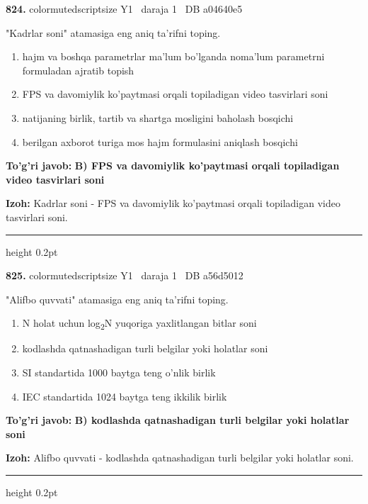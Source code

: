 \documentclass[10pt,a4paper,oneside]{article}
\begin{document}
\noindent\textbf{\color{ink}824.}  {color{muted}scriptsize Y1 \textbullet\ daraja 1 \textbullet\ DB a04640e5}
\par
"Kadrlar soni" atamasiga eng aniq ta'rifni toping.
\begin{enumerate}[label=\Alph*),leftmargin=9mm]
\item hajm va boshqa parametrlar ma'lum bo'lganda noma'lum parametrni formuladan ajratib topish
\item FPS va davomiylik ko'paytmasi orqali topiladigan video tasvirlari soni
\item natijaning birlik, tartib va shartga mosligini baholash bosqichi
\item berilgan axborot turiga mos hajm formulasini aniqlash bosqichi
\end{enumerate}
\begin{tcolorbox}[enhanced,breakable,colback=teal!4,colframe=teal!50!black,boxrule=0.5pt,arc=1.1mm,left=3mm,right=3mm,top=1.7mm,bottom=1.7mm,before skip=2mm,after skip=2mm]
\textbf{\color{teal}To'g'ri javob:} \textbf{B) FPS va davomiylik ko'paytmasi orqali topiladigan video tasvirlari soni}
\par\smallskip
\textbf{Izoh:} Kadrlar soni - FPS va davomiylik ko'paytmasi orqali topiladigan video tasvirlari soni.
\end{tcolorbox}
\vspace{2mm}\hrule height 0.2pt \vspace{3mm}

\noindent\textbf{\color{ink}825.}  {color{muted}scriptsize Y1 \textbullet\ daraja 1 \textbullet\ DB a56d5012}
\par
"Alifbo quvvati" atamasiga eng aniq ta'rifni toping.
\begin{enumerate}[label=\Alph*),leftmargin=9mm]
\item N holat uchun log\textsubscript{2}N yuqoriga yaxlitlangan bitlar soni
\item kodlashda qatnashadigan turli belgilar yoki holatlar soni
\item SI standartida 1000 baytga teng o'nlik birlik
\item IEC standartida 1024 baytga teng ikkilik birlik
\end{enumerate}
\begin{tcolorbox}[enhanced,breakable,colback=teal!4,colframe=teal!50!black,boxrule=0.5pt,arc=1.1mm,left=3mm,right=3mm,top=1.7mm,bottom=1.7mm,before skip=2mm,after skip=2mm]
\textbf{\color{teal}To'g'ri javob:} \textbf{B) kodlashda qatnashadigan turli belgilar yoki holatlar soni}
\par\smallskip
\textbf{Izoh:} Alifbo quvvati - kodlashda qatnashadigan turli belgilar yoki holatlar soni.
\end{tcolorbox}
\vspace{2mm}\hrule height 0.2pt \vspace{3mm}
\end{document}
